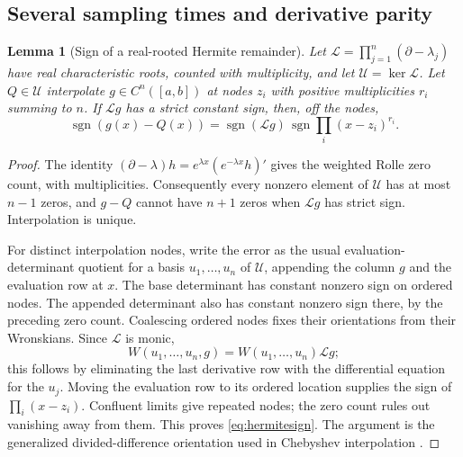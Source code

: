 \documentclass[11pt]{article}
\numberwithin{equation}{section}
\newtheorem{lemma}[lemma]{Lemma}
\theoremstyle{definition}
\theoremstyle{remark}
\begin{document}
\subsection{Several sampling times and derivative parity}
\begin{lemma}[Sign of a real-rooted Hermite remainder]\label{lem:hermitesign}
Let $\mathcal L=\prod_{j=1}^{n}(\partial-\lambda_j)$ have real characteristic roots, counted with multiplicity, and let $\mathcal U=\ker\mathcal L$. Let $Q\in\mathcal U$ interpolate $g\in C^n([a,b])$ at nodes $z_i$ with positive multiplicities $r_i$ summing to $n$. If $\mathcal Lg$ has a strict constant sign, then, off the nodes,
\begin{equation}\label{eq:hermitesign}
 \operatorname{sgn}(g(x)-Q(x))
 =\operatorname{sgn}(\mathcal Lg)\,
   \operatorname{sgn}\prod_i(x-z_i)^{r_i}.
\end{equation}
\end{lemma}
\begin{proof}
The identity $(\partial-\lambda)h=e^{\lambda x}(e^{-\lambda x}h)'$ gives the weighted Rolle zero count, with multiplicities. Consequently every nonzero element of $\mathcal U$ has at most $n-1$ zeros, and $g-Q$ cannot have $n+1$ zeros when $\mathcal Lg$ has strict sign. Interpolation is unique.

For distinct interpolation nodes, write the error as the usual evaluation-determinant quotient for a basis $u_1,\ldots,u_n$ of $\mathcal U$, appending the column $g$ and the evaluation row at $x$. The base determinant has constant nonzero sign on ordered nodes. The appended determinant also has constant nonzero sign there, by the preceding zero count. Coalescing ordered nodes fixes their orientations from their Wronskians. Since $\mathcal L$ is monic,
\[
 W(u_1,\ldots,u_n,g)=W(u_1,\ldots,u_n)\mathcal Lg;
\]
this follows by eliminating the last derivative row with the differential equation for the $u_j$. Moving the evaluation row to its ordered location supplies the sign of $\prod_i(x-z_i)$. Confluent limits give repeated nodes; the zero count rules out vanishing away from them. This proves \eqref{eq:hermitesign}. The argument is the generalized divided-difference orientation used in Chebyshev interpolation \cite{KarlinStudden1966,Pinelis2011}.
\end{proof}
\end{document}
